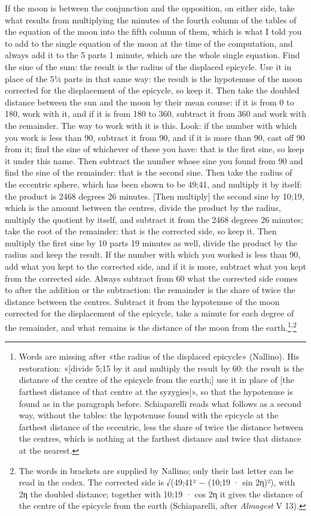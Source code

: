 \documentclass[11pt]{article}
\newcommand{\ArPage}[1]{\marginpar{\footnotesize\color{gray}Ar.\,p.\,#1}}
\begin{document}
\par \ArPage{118}If the moon is between the conjunction and the opposition, on either side, take what results from multiplying the minutes of the fourth column of the tables of the equation of the moon into the fifth column of them, which is what I told you to add to the single equation of the moon at the time of the computation, and always add it to the 5 parts 1 minute, which are the whole single equation. Find the sine of the sum: the result is the radius of the displaced epicycle. Use it in place of the 5¼ parts in that same way: the result is the hypotenuse of the moon corrected for the displacement of the epicycle, so keep it. Then take the doubled distance between the sun and the moon by their mean course: if it is from 0 to 180, work with it, and if it is from 180 to 360, subtract it from 360 and work with the remainder. The way to work with it is this. Look: if the number with which you work is less than 90, subtract it from 90, and if it is more than 90, cast off 90 from it; find the sine of whichever of these you have: that is the first sine, so keep it under this name. Then subtract the number whose sine you found from 90 and find the sine of the remainder: that is the second sine. Then take the radius of the eccentric sphere, which has been shown to be 49;41, and multiply it by itself: the product is 2468 degrees 26 minutes. [Then multiply] the second sine by 10;19, which is the amount between the centres, divide the product by the radius, multiply the quotient by itself, and subtract it from the 2468 degrees 26 minutes; take the root of the remainder: that is the corrected side, so keep it. Then multiply the first sine by 10 parts 19 minutes as well, divide the product by the radius and keep the result. If the number with which you worked is less than 90, add what you kept to the corrected side, and if it is more, subtract what you kept from the corrected side. Always subtract from 60 what the corrected side comes to after the addition or the subtraction: the remainder is the share of twice the distance between the centres. Subtract it from the hypotenuse of the moon corrected for the displacement of the epicycle, take a minute for each degree of the remainder, and what remains is the distance of the moon from the earth.\footnote{Words are missing after «the radius of the displaced epicycle» (Nallino). His restoration: «[divide 5;15 by it and multiply the result by 60: the result is the distance of the centre of the epicycle from the earth;] use it in place of [the farthest distance of that centre at the syzygies]», so that the hypotenuse is found as in the paragraph before. Schiaparelli reads what follows as a second way, without the tables: the hypotenuse found with the epicycle at the farthest distance of the eccentric, less the share of twice the distance between the centres, which is nothing at the farthest distance and twice that distance at the nearest.}\textsuperscript{,}\footnote{The words in brackets are supplied by Nallino; only their last letter can be read in the codex. The corrected side is √(49;41² − (10;19 · sin 2η)²), with 2η the doubled distance; together with 10;19 · cos 2η it gives the distance of the centre of the epicycle from the earth (Schiaparelli, after \emph{Almagest} V 13).}\par
\end{document}
